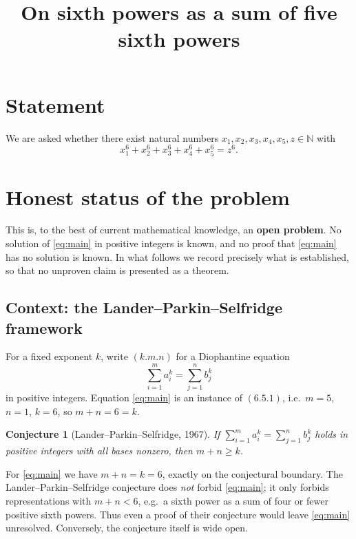 \documentclass{amsart}
\newtheorem{conjecture}{Conjecture}
\begin{document}
\title{On sixth powers as a sum of five sixth powers}
\maketitle

\section*{Statement}
We are asked whether there exist natural numbers
$x_1,x_2,x_3,x_4,x_5,z\in\mathbb{N}$ with
\begin{equation}\label{eq:main}
x_1^6+x_2^6+x_3^6+x_4^6+x_5^6=z^6 .
\end{equation}

\section*{Honest status of the problem}

This is, to the best of current mathematical knowledge, an
\textbf{open problem}. No solution of \eqref{eq:main} in positive
integers is known, and no proof that \eqref{eq:main} has no solution
is known. In what follows we record precisely what is established, so
that no unproven claim is presented as a theorem.

\subsection*{Context: the Lander--Parkin--Selfridge framework}
For a fixed exponent $k$, write $(k.m.n)$ for a Diophantine equation
$$\sum_{i=1}^{m}a_i^{k}=\sum_{j=1}^{n}b_j^{k}$$
in positive integers. Equation \eqref{eq:main} is an instance of
$(6.5.1)$, i.e.\ $m=5$, $n=1$, $k=6$, so $m+n=6=k$.

\begin{conjecture}[Lander--Parkin--Selfridge, 1967]
If $\sum_{i=1}^{m}a_i^{k}=\sum_{j=1}^{n}b_j^{k}$ holds in positive
integers with all bases nonzero, then $m+n\ge k$.
\end{conjecture}

For \eqref{eq:main} we have $m+n=k=6$, exactly on the conjectural
boundary. The Lander--Parkin--Selfridge conjecture does \emph{not}
forbid \eqref{eq:main}; it only forbids representations with $m+n<6$,
e.g.\ a sixth power as a sum of four or fewer positive sixth powers.
Thus even a proof of their conjecture would leave \eqref{eq:main}
unresolved. Conversely, the conjecture itself is wide open.
\end{document}
